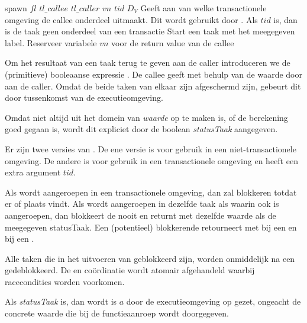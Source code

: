 \begin{functie}{spawn $fl$ $tl\_callee$ $tl\_caller$ $vn$ $tid$ $D_V$}
	Geeft aan van welke transactionele omgeving de callee onderdeel uitmaakt. Dit wordt gebruikt door
	. Als $tid$  is, dan is de taak geen onderdeel van een transactie
	\functieomschrijving
	Start een taak met het meegegeven label. Reserveer variabele $vn$ voor de return value van de callee
\end{functie}


Om het resultaat van een taak terug te geven aan de caller introduceren we de (primitieve) booleaanse expressie
. De callee geeft met behulp van  de waarde door aan de caller. Omdat de beide
taken van elkaar zijn afgeschermd zijn, gebeurt dit door tussenkomst van de executieomgeving.

Omdat niet altijd uit het domein van \textsl{waarde} op te maken is, of de berekening goed gegaan is, wordt
dit expliciet door de boolean \textsl{statusTaak} aangegeven.

Er zijn twee versies van . De ene versie is voor gebruik in een niet-transactionele omgeving. De andere
is voor gebruik in een transactionele omgeving en heeft een extra argument $tid$.

Als  wordt aangeroepen in een transactionele omgeving, dan zal  blokkeren totdat er
 of  plaats vindt. Als  wordt aangeroepen in dezelfde taak
als waarin ook  is aangeroepen, dan blokkeert de  nooit en returnt met dezelfde
waarde als de meegegeven statusTaak. Een (potentieel) blokkerende  retourneert met  bij een
 en  bij een .

Alle taken die in het uitvoeren van  geblokkeerd zijn, worden onmiddelijk na een 
gedeblokkeerd. De  en  co\"ordinatie wordt atomair afgehandeld waarbij racecondities worden voorkomen.

Als \textsl{statusTaak}  is, dan wordt is \(a\) door de executieomgeving op  gezet, ongeacht de
concrete waarde die bij de functieaanroep wordt doorgegeven.

